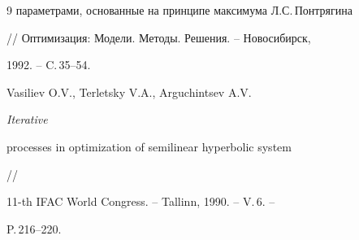 \begin{thebibliography}{9}
{параметрами, основанные на принципе максимума Л.С.\,Понтрягина}


// Оптимизация: Модели. Методы. Решения. -- Новосибирск,


1992. -- C.\,35--54.




Vasiliev O.V., Terletsky V.A., Arguchintsev A.V. {\em Iterative


processes in optimization of semilinear hyperbolic system} //


11-th IFAC World Congress. -- Tallinn, 1990. -- V.\,6. --


P.\,216--220.





\end{thebibliography}





\vskip 2cm












\label{end}





